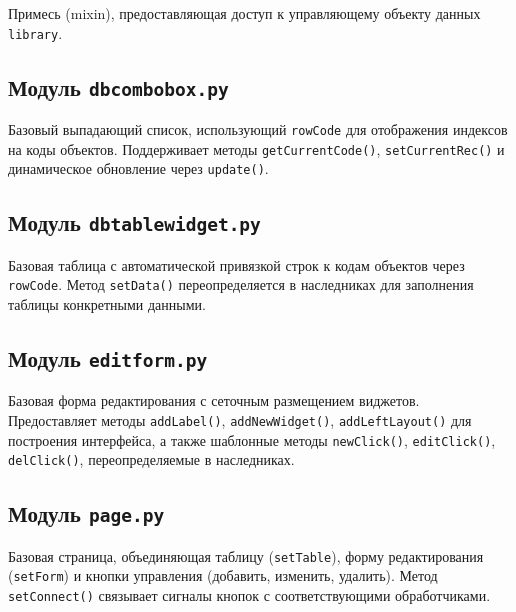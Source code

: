 \documentclass[14pt,a4paper]{extreport}
\begin{document}
Примесь (mixin), предоставляющая доступ к управляющему объекту данных \texttt{library}.



\subsection{Модуль \texttt{dbcombobox.py}}

Базовый выпадающий список, использующий \texttt{rowCode} для отображения индексов на коды объектов. Поддерживает методы \texttt{getCurrentCode()}, \texttt{setCurrentRec()} и динамическое обновление через \texttt{update()}.



\subsection{Модуль \texttt{dbtablewidget.py}}

Базовая таблица с автоматической привязкой строк к кодам объектов через \texttt{rowCode}. Метод \texttt{setData()} переопределяется в наследниках для заполнения таблицы конкретными данными.



\subsection{Модуль \texttt{editform.py}}

Базовая форма редактирования с сеточным размещением виджетов. Предоставляет методы \texttt{addLabel()}, \texttt{addNewWidget()}, \texttt{addLeftLayout()} для построения интерфейса, а также шаблонные методы \texttt{newClick()}, \texttt{editClick()}, \texttt{delClick()}, переопределяемые в наследниках.



\subsection{Модуль \texttt{page.py}}

Базовая страница, объединяющая таблицу (\texttt{setTable}), форму редактирования (\texttt{setForm}) и кнопки управления (добавить, изменить, удалить). Метод \texttt{setConnect()} связывает сигналы кнопок с соответствующими обработчиками.
\end{document}
